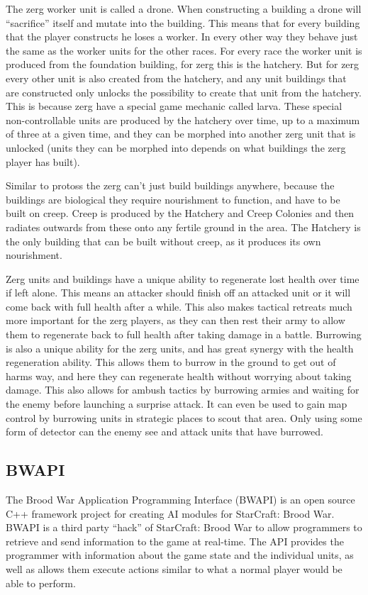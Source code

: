 The zerg worker unit is called a drone. When constructing a building a drone
will ``sacrifice'' itself and mutate into the building. This means that for
every building that the player constructs he loses a worker. In every other way
they behave just the same as the worker units for the other races. For every
race the worker unit is produced from the foundation building, for zerg this is
the hatchery. But for zerg every other unit is also created from the hatchery,
and any unit buildings that are constructed only unlocks the possibility to
create that unit from the hatchery. This is because zerg have a special game
mechanic called larva. These special non-controllable units are produced by the
hatchery over time, up to a maximum of three at a given time, and they can be
morphed into another zerg unit that is unlocked (units they can be morphed into
depends on what buildings the zerg player has built).

Similar to protoss the zerg can't just build buildings anywhere, because the
buildings are biological they require nourishment to function, and have to be
built on creep. Creep is produced by the Hatchery and Creep Colonies and then
radiates outwards from these onto any fertile ground in the area. The Hatchery
is the only building that can be built without creep, as it produces its own
nourishment. 

Zerg units and buildings have a unique ability to regenerate lost health over
time if left alone. This means an attacker should finish off an attacked unit or
it will come back with full health after a while. This also makes tactical
retreats much more important for the zerg players, as they can then rest their
army to allow them to regenerate back to full health after taking damage in a
battle. Burrowing is also a unique ability for the zerg units, and has great
synergy with the health regeneration ability. This allows them to burrow in the
ground to get out of harms way, and here they can regenerate health without
worrying about taking damage. This also allows for ambush tactics by burrowing
armies and waiting for the enemy before launching a surprise attack. It can even
be used to gain map control by burrowing units in strategic places to scout that
area. Only using some form of detector can the enemy see and attack units that
have burrowed. 

\subsection{BWAPI}
The Brood War Application Programming Interface (BWAPI)\cite{bwapi} is an open
source C++ framework project for creating AI modules for StarCraft: Brood War.
BWAPI is a third party ``hack'' of StarCraft: Brood War to allow programmers to
retrieve and send information to the game at real-time. The API provides the
programmer with information about the game state and the individual units, as
well as allows them execute actions similar to what a normal player would be
able to perform. 

